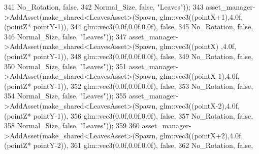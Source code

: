 \begin{DoxyCode}
341                                                              No\_Rotation, \textcolor{keyword}{false},
342                                                              Normal\_Size, \textcolor{keyword}{false}, \textcolor{stringliteral}{"Leaves"}));
343             asset\_manager->AddAsset(make\_shared<LeavesAsset>(Spawn, glm::vec3((pointX+1),4.0f,(pointZ*
      pointY-1)),
344                                                              glm::vec3(0.0f,0.0f,0.0f), \textcolor{keyword}{false},
345                                                              No\_Rotation, \textcolor{keyword}{false},
346                                                              Normal\_Size, \textcolor{keyword}{false}, \textcolor{stringliteral}{"Leaves"}));
347             asset\_manager->AddAsset(make\_shared<LeavesAsset>(Spawn, glm::vec3((pointX)  ,4.0f,(pointZ*
      pointY-1)),
348                                                              glm::vec3(0.0f,0.0f,0.0f), \textcolor{keyword}{false},
349                                                              No\_Rotation, \textcolor{keyword}{false},
350                                                              Normal\_Size, \textcolor{keyword}{false}, \textcolor{stringliteral}{"Leaves"}));
351             asset\_manager->AddAsset(make\_shared<LeavesAsset>(Spawn, glm::vec3((pointX-1),4.0f,(pointZ*
      pointY-1)),
352                                                              glm::vec3(0.0f,0.0f,0.0f), \textcolor{keyword}{false},
353                                                              No\_Rotation, \textcolor{keyword}{false},
354                                                              Normal\_Size, \textcolor{keyword}{false}, \textcolor{stringliteral}{"Leaves"}));
355             asset\_manager->AddAsset(make\_shared<LeavesAsset>(Spawn, glm::vec3((pointX-2),4.0f,(pointZ*
      pointY-1)),
356                                                              glm::vec3(0.0f,0.0f,0.0f), \textcolor{keyword}{false},
357                                                              No\_Rotation, \textcolor{keyword}{false},
358                                                              Normal\_Size, \textcolor{keyword}{false}, \textcolor{stringliteral}{"Leaves"}));
359  
360             asset\_manager->AddAsset(make\_shared<LeavesAsset>(Spawn, glm::vec3((pointX+2),4.0f,(pointZ*
      pointY-2)),
361                                                              glm::vec3(0.0f,0.0f,0.0f), \textcolor{keyword}{false},
362                                                              No\_Rotation, \textcolor{keyword}{false},

\end{DoxyCode}
